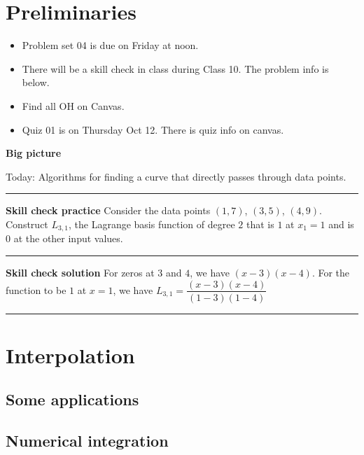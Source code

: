 \documentclass[12pt,letterpaper,noanswers]{exam}
\begin{document}
 \pdfpageheight 11in 
  \pdfpagewidth 8.5in

\noindent 

\section*{Preliminaries}

\begin{itemize}
\itemsep0pt
\item Problem set 04 is due on Friday at noon.
\item There will be a skill check in class during Class 10.  The problem info is below.
\item Find all OH on Canvas.
\item Quiz 01 is on Thursday Oct 12.  There is quiz info on canvas.
\end{itemize}



\noindent\textbf{Big picture}

Today: Algorithms for finding a curve that directly passes through data points.

\vspace{0.2cm}
\hrule
\vspace{0.2cm}

\noindent \textbf{Skill check practice}
 Consider the data points $(1,7)$, $(3, 5)$, $(4, 9)$.  Construct $L_{3,1}$, the Lagrange basis function of degree $2$ that is $1$ at $x_1 = 1$ and is $0$ at the other input values.



\vspace{0.2cm}
\hrule
\vspace{0.2cm}

\noindent \textbf{Skill check solution}
For zeros at $3$ and $4$, we have $(x-3)(x-4)$.  For the function to be $1$ at $x = 1$, we have $L_{3,1} = \dfrac{(x-3)(x-4)}{(1-3)(1-4)}$

\vspace{0.2cm}
\hrule
\vspace{0.2cm}


\section*{Interpolation}
\subsection*{Some applications}

\subsection*{Numerical integration}
\end{document}
